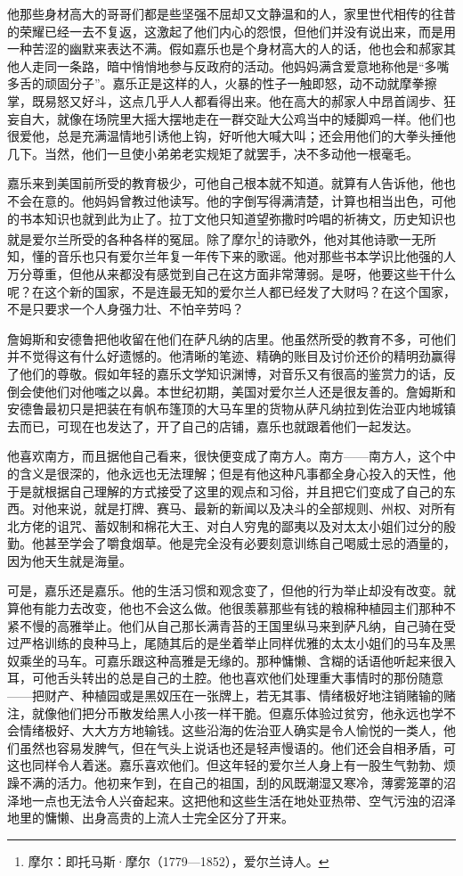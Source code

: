 \par 他那些身材高大的哥哥们都是些坚强不屈却又文静温和的人，家里世代相传的往昔的荣耀已经一去不复返，这激起了他们内心的怨恨，但他们并没有说出来，而是用一种苦涩的幽默来表达不满。假如嘉乐也是个身材高大的人的话，他也会和郝家其他人走同一条路，暗中悄悄地参与反政府的活动。他妈妈满含爱意地称他是“多嘴多舌的顽固分子”。嘉乐正是这样的人，火暴的性子一触即怒，动不动就摩拳擦掌，既易怒又好斗，这点几乎人人都看得出来。他在高大的郝家人中昂首阔步、狂妄自大，就像在场院里大摇大摆地走在一群交趾大公鸡当中的矮脚鸡一样。他们也很爱他，总是充满温情地引诱他上钩，好听他大喊大叫；还会用他们的大拳头捶他几下。当然，他们一旦使小弟弟老实规矩了就罢手，决不多动他一根毫毛。
\par 嘉乐来到美国前所受的教育极少，可他自己根本就不知道。就算有人告诉他，他也不会在意的。他妈妈曾教过他读写。他的字倒写得满清楚，计算也相当出色，可他的书本知识也就到此为止了。拉丁文他只知道望弥撒时吟唱的祈祷文，历史知识也就是爱尔兰所受的各种各样的冤屈。除了摩尔\footnote{摩尔：即托马斯·摩尔（1779—1852），爱尔兰诗人。}的诗歌外，他对其他诗歌一无所知，懂的音乐也只有爱尔兰年复一年传下来的歌谣。他对那些书本学识比他强的人万分尊重，但他从来都没有感觉到自己在这方面非常薄弱。是呀，他要这些干什么呢？在这个新的国家，不是连最无知的爱尔兰人都已经发了大财吗？在这个国家，不是只要求一个人身强力壮、不怕辛劳吗？
\par 詹姆斯和安德鲁把他收留在他们在萨凡纳的店里。他虽然所受的教育不多，可他们并不觉得这有什么好遗憾的。他清晰的笔迹、精确的账目及讨价还价的精明劲赢得了他们的尊敬。假如年轻的嘉乐文学知识渊博，对音乐又有很高的鉴赏力的话，反倒会使他们对他嗤之以鼻。本世纪初期，美国对爱尔兰人还是很友善的。詹姆斯和安德鲁最初只是把装在有帆布篷顶的大马车里的货物从萨凡纳拉到佐治亚内地城镇去而已，可现在也发达了，开了自己的店铺，嘉乐也就跟着他们一起发达。
\par 他喜欢南方，而且据他自己看来，很快便变成了南方人。南方——南方人，这个中的含义是很深的，他永远也无法理解；但是有他这种凡事都全身心投入的天性，他于是就根据自己理解的方式接受了这里的观点和习俗，并且把它们变成了自己的东西。对他来说，就是打牌、赛马、最新的新闻以及决斗的全部规则、州权、对所有北方佬的诅咒、蓄奴制和棉花大王、对白人穷鬼的鄙夷以及对太太小姐们过分的殷勤。他甚至学会了嚼食烟草。他是完全没有必要刻意训练自己喝威士忌的酒量的，因为他天生就是海量。
\par 可是，嘉乐还是嘉乐。他的生活习惯和观念变了，但他的行为举止却没有改变。就算他有能力去改变，他也不会这么做。他很羡慕那些有钱的粮棉种植园主们那种不紧不慢的高雅举止。他们从自己那长满青苔的王国里纵马来到萨凡纳，自己骑在受过严格训练的良种马上，尾随其后的是坐着举止同样优雅的太太小姐们的马车及黑奴乘坐的马车。可嘉乐跟这种高雅是无缘的。那种慵懒、含糊的话语他听起来很入耳，可他舌头转出的总是自己的土腔。他也喜欢他们处理重大事情时的那份随意——把财产、种植园或是黑奴压在一张牌上，若无其事、情绪极好地注销赌输的赌注，就像他们把分币散发给黑人小孩一样干脆。但嘉乐体验过贫穷，他永远也学不会情绪极好、大大方方地输钱。这些沿海的佐治亚人确实是令人愉悦的一类人，他们虽然也容易发脾气，但在气头上说话也还是轻声慢语的。他们还会自相矛盾，可这也同样令人着迷。嘉乐喜欢他们。但这年轻的爱尔兰人身上有一股生气勃勃、烦躁不满的活力。他初来乍到，在自己的祖国，刮的风既潮湿又寒冷，薄雾笼罩的沼泽地一点也无法令人兴奋起来。这把他和这些生活在地处亚热带、空气污浊的沼泽地里的慵懒、出身高贵的上流人士完全区分了开来。
